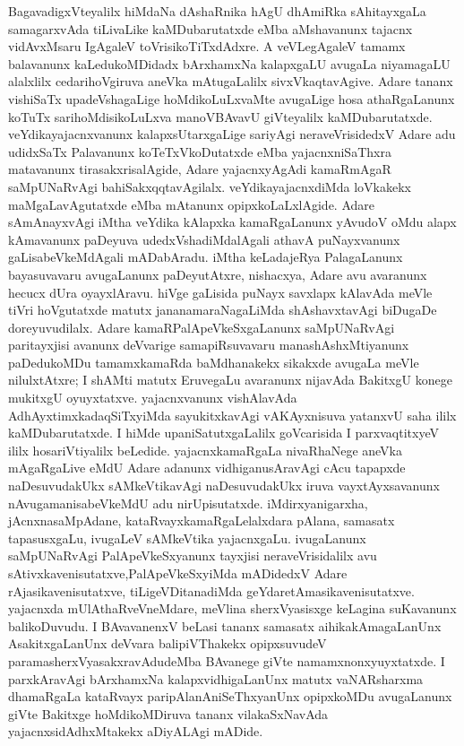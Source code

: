 BagavadigxVteyalilx hiMdaNa dAshaRnika hAgU dhAmiRka sAhitayxgaLa samagarx\-vAda tiLivaLike kaMDubarutatxde eMba aMshavanunx tajacnx vidAvxMsaru IgAgaleV toVrisi\-koTiTx\-dAdxre. A veVLegAgaleV tamamx balavanunx kaLedukoMDidadx bArxhamxNa kalapxgaLU avugaLa niyamagaLU alalxlilx cedarihoVgiruva aneVka mAtugaLalilx sivxVkaqtavAgive. Adare tananx vishiSaTx upadeVshagaLige hoMdikoLuLxvaMte avugaLige hosa athaRgaLanunx koTuTx sarihoMdisikoLuLxva manoVBAvavU giVteyalilx kaMDubarutatxde. veYdikayajacnxvanunx kalapxsUtarxgaLige sariyAgi neraveVrisidedxV Adare adu udidxSaTx Palavanunx koTeTxVkoDu\-tatxde eMba yajacnxniSaThxra matavanunx tirasakxrisalAgide, Adare yajacnxyAgAdi kamaR\-mAgaR saMpUNaRvAgi bahiSakxqqtavAgilalx. veYdikayajacnxdiMda loVkakekx maMgaLavAgutatxde eMba mAtanunx opipxkoLaLxlAgide. Adare sAmAnayxvAgi iMtha veYdika kAlapxka kamaR\-gaLanunx yAvudoV oMdu alapx kAmavanunx paDeyuva udedxVshadiMdalAgali athavA puNayx\-vanunx gaLisabeVkeMdAgali mADabAradu. iMtha keLadajeRya PalagaLanunx bayasu\-vavaru avugaLanunx paDeyutAtxre, nishacxya, Adare avu avaranunx hecucx dUra oyayx\-lAravu. hiVge gaLisida puNayx savxlapx kAlavAda meVle tiVri hoVgutatxde matutx jananamaraNagaLiMda shAshavxtavAgi biDugaDe doreyuvudilalx. Adare kamaRPalApeVkeSx\-gaLanunx saMpUNaR\-vAgi paritayxjisi avanunx deVvarige samapiRsuvavaru manashAshxMtiyanunx paDedukoMDu tamamx\break kamaRda baMdhanakekx sikakxde avugaLa meVle nilulxtAtxre; I shAMti matutx EruvegaLu ava\-ranunx nijavAda BakitxgU konege mukitxgU oyuyxtatxve. yajacnxvanunx vishAlavAda AdhAyxtimxka\break daqSiTxyiMda sayukitxkavAgi vAKAyxnisuva yatanxvU saha ililx kaMDubarutatxde. I hiMde upaniSatutxgaLalilx goVcarisida I parxvaqtitxyeV ililx hosariVtiyalilx beLedide. yajacnx\-kamaRgaLa nivaRhaNege aneVka mAgaRgaLive eMdU Adare adanunx vidhiganusAravAgi cAcu tapapxde naDesuvudakUkx sAMkeVtikavAgi naDesuvudakUkx iruva vayxtAyxsavanunx nAvu\break gamanisabeVkeMdU adu nirUpisutatxde. iMdirxyanigarxha, jAcnxnasaMpAdane, kataRvayx\break kamaRgaLelalxdara pAlana, samasatx tapasusxgaLu, ivugaLeV sAMkeVtika yajacnxgaLu. ivu\-gaLanunx saMpUNaRvAgi PalApeVkeSxyanunx tayxjisi neraveVrisidalilx avu sAtivxkavenisu\-tatxve,\break PalApeVkeSxyiMda mADidedxV Adare rAjasikavenisutatxve, tiLigeVDitanadiMda geYdare\break tAmasikavenisutatxve. yajacnxda mUlAthaRveVneMdare, meVlina sherxVyasisxge keLagina suKa\-vanunx balikoDuvudu. I BAvavanenxV beLasi tananx samasatx aihikakAmagaLanUnx Asakitx\-gaLanUnx deVvara balipiVThakekx opipxsuvudeV paramasherxVyasakxravAdudeMba BAvanege giVte namamxnonxyuyxtatxde. I parxkAravAgi bArxhamxNa kalapxvidhigaLanUnx matutx vaNARsharxma dhamaR\-gaLa kataRvayx paripAlanAniSeThxyanUnx opipxkoMDu avugaLanunx giVte Bakitxge hoMdi\break\-koMDiruva tananx vilakaSxNavAda yajacnxsidAdhxMtakekx aDiyALAgi mADide.


